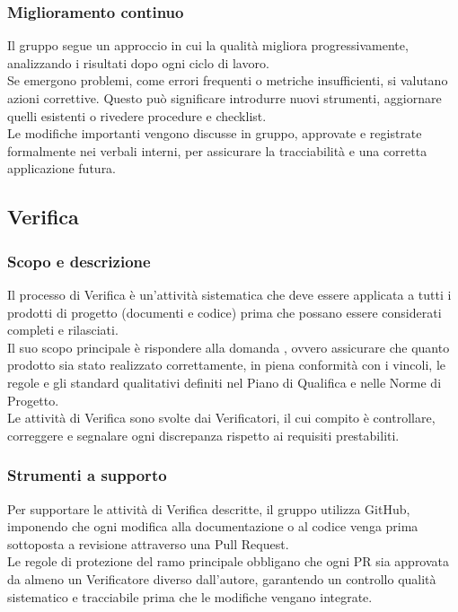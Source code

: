 \subsubsection{Miglioramento continuo}
Il gruppo segue un approccio in cui la qualità migliora progressivamente, analizzando i risultati dopo ogni ciclo di lavoro.\\ 
Se emergono problemi, come errori frequenti o metriche insufficienti, si valutano azioni correttive. Questo può significare introdurre nuovi strumenti, aggiornare quelli esistenti o rivedere procedure e checklist.\\ Le modifiche importanti vengono discusse in gruppo, approvate e registrate formalmente nei verbali interni, per assicurare la tracciabilità e una corretta applicazione futura.

\subsection{Verifica}
\label{sec:verifica}
\subsubsection{Scopo e descrizione}
Il processo di Verifica è un'attività sistematica che deve essere applicata a tutti i prodotti di progetto (documenti e codice) prima che possano essere considerati completi e rilasciati.\\ 
Il suo scopo principale è rispondere alla domanda , ovvero assicurare che quanto prodotto sia stato realizzato correttamente, in piena conformità con i vincoli, le regole e gli standard qualitativi definiti nel Piano di Qualifica e nelle Norme di Progetto.\\ 
Le attività di Verifica sono svolte dai Verificatori, il cui compito è controllare, correggere e segnalare ogni discrepanza rispetto ai requisiti prestabiliti.

\subsubsection{Strumenti a supporto}
Per supportare le attività di Verifica descritte, il gruppo utilizza GitHub, imponendo che ogni modifica alla documentazione o al codice venga prima sottoposta a revisione attraverso una Pull Request.\\ 
Le regole di protezione del ramo principale obbligano che ogni PR sia approvata da almeno un Verificatore diverso dall'autore, garantendo un controllo qualità sistematico e tracciabile prima che le modifiche vengano integrate.

